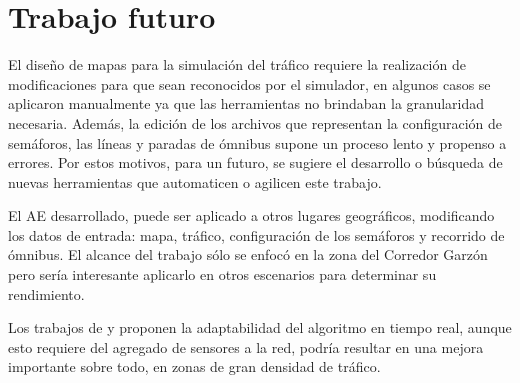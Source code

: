 \section{Trabajo futuro}

El diseño de mapas para la simulación del tráfico requiere la realización de modificaciones para que sean reconocidos por el simulador, en algunos casos se aplicaron manualmente ya que las herramientas no brindaban la granularidad necesaria. Además, la edición de los archivos que representan la configuración de semáforos, las líneas y paradas de ómnibus supone un proceso lento y propenso a errores. Por estos motivos, para un futuro, se sugiere el desarrollo o búsqueda de nuevas herramientas que automaticen o agilicen este trabajo.

El AE desarrollado, puede ser aplicado a otros lugares geográficos, modificando  los datos de entrada: mapa, tráfico, configuración de los semáforos y recorrido de ómnibus. El alcance del trabajo sólo se enfocó en la zona del Corredor Garzón pero sería interesante aplicarlo en otros escenarios para determinar su rendimiento.

Los trabajos de  \citet{Montana1996} y \citet{Vogel2000} proponen la adaptabilidad del algoritmo en tiempo real, aunque esto requiere del agregado de sensores a la red, podría resultar en una mejora importante sobre todo, en zonas de gran densidad de tráfico.
